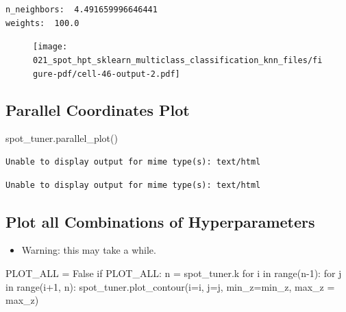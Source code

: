 \documentclass[
  letterpaper,
  DIV=11,
  numbers=noendperiod]{scrreprt}
\newenvironment{Shaded}{\begin{snugshade}}{\end{snugshade}}
\newcommand{\BuiltInTok}[1]{\textcolor[rgb]{0.00,0.23,0.31}{#1}}
\newcommand{\ControlFlowTok}[1]{\textcolor[rgb]{0.00,0.23,0.31}{#1}}
\newcommand{\DecValTok}[1]{\textcolor[rgb]{0.68,0.00,0.00}{#1}}
\newcommand{\KeywordTok}[1]{\textcolor[rgb]{0.00,0.23,0.31}{#1}}
\newcommand{\NormalTok}[1]{\textcolor[rgb]{0.00,0.23,0.31}{#1}}
\newcommand{\OperatorTok}[1]{\textcolor[rgb]{0.37,0.37,0.37}{#1}}
\newcommand{\VariableTok}[1]{\textcolor[rgb]{0.07,0.07,0.07}{#1}}
\providecommand{\tightlist}{%
  \setlength{\itemsep}{0pt}\setlength{\parskip}{0pt}}\usepackage{longtable,booktabs,array}
\begin{document}
\begin{verbatim}
n_neighbors:  4.491659996646441
weights:  100.0
\end{verbatim}

\begin{figure}[H]

{\centering \texttt{[image: 021\_spot\_hpt\_sklearn\_multiclass\_classification\_knn\_files/figure-pdf/cell-46-output-2.pdf]}

}

\end{figure}

\hypertarget{parallel-coordinates-plot-4}{%
\subsection{Parallel Coordinates
Plot}\label{parallel-coordinates-plot-4}}

\begin{Shaded}
\begin{Highlighting}[]
\NormalTok{spot\_tuner.parallel\_plot()}
\end{Highlighting}
\end{Shaded}

\begin{verbatim}
Unable to display output for mime type(s): text/html
\end{verbatim}

\begin{verbatim}
Unable to display output for mime type(s): text/html
\end{verbatim}

\hypertarget{plot-all-combinations-of-hyperparameters-4}{%
\subsection{Plot all Combinations of
Hyperparameters}\label{plot-all-combinations-of-hyperparameters-4}}

\begin{itemize}
\tightlist
\item
  Warning: this may take a while.
\end{itemize}

\begin{Shaded}
\begin{Highlighting}[]
\NormalTok{PLOT\_ALL }\OperatorTok{=} \VariableTok{False}
\ControlFlowTok{if}\NormalTok{ PLOT\_ALL:}
\NormalTok{    n }\OperatorTok{=}\NormalTok{ spot\_tuner.k}
    \ControlFlowTok{for}\NormalTok{ i }\KeywordTok{in} \BuiltInTok{range}\NormalTok{(n}\OperatorTok{{-}}\DecValTok{1}\NormalTok{):}
        \ControlFlowTok{for}\NormalTok{ j }\KeywordTok{in} \BuiltInTok{range}\NormalTok{(i}\OperatorTok{+}\DecValTok{1}\NormalTok{, n):}
\NormalTok{            spot\_tuner.plot\_contour(i}\OperatorTok{=}\NormalTok{i, j}\OperatorTok{=}\NormalTok{j, min\_z}\OperatorTok{=}\NormalTok{min\_z, max\_z }\OperatorTok{=}\NormalTok{ max\_z)}
\end{Highlighting}
\end{Shaded}
\end{document}
